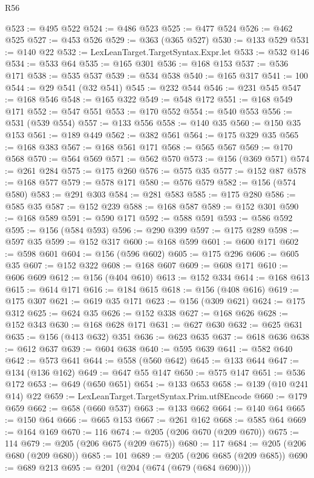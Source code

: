 \begin{lexlean}{R56}
\begin{coremodule}
{{{{{{{{{{{{{{{{{{{{{{{{{{{{{{{{{{{{{{{{{{{{{{{{{{{{{{{{{{{{{{{{{{{{{{{{{{{{{{{{{{{{{{{{{{{{{{{{{{{{{{{{{{{{{{{{{{{{{{{{{{{{{{{{{{{{{{{{{{{{{{{{{{{{{{{{{{{{{{{{{{{{{{{{{{{{{{{{{{{{{{{{{{{{{{{{{{{{{{{{{{{{{{{{{{{@523 := @495 @522
@524 := @486 @523
@525 := @477 @524
@526 := @462 @525
@527 := @453 @526
@529 := @363 (@365 @527)
@530 := @133 @529
@531 := @140 @22
@532 := LexLeanTarget.TargetSyntax.Expr.let
@533 := @532 @146
@534 := @533 @64
@535 := @165 @301
@536 := @168 @153
@537 := @536 @171
@538 := @535 @537
@539 := @534 @538
@540 := @165 @317
@541 := 100
@544 := @29 @541 (@32 @541)
@545 := @232 @544
@546 := @231 @545
@547 := @168 @546
@548 := @165 @322
@549 := @548 @172
@551 := @168 @549 @171
@552 := @547 @551
@553 := @170 @552
@554 := @540 @553
@556 := @531 (@539 @554)
@557 := @133 @556
@558 := @140 @35
@560 := @150 @35 @153
@561 := @189 @449
@562 := @382 @561
@564 := @175 @329 @35
@565 := @168 @383
@567 := @168 @561 @171
@568 := @565 @567
@569 := @170 @568
@570 := @564 @569
@571 := @562 @570
@573 := @156 (@369 @571)
@574 := @261 @284
@575 := @175 @260
@576 := @575 @35
@577 := @152 @87
@578 := @168 @577
@579 := @578 @171
@580 := @576 @579
@582 := @156 (@574 @580)
@583 := @291 @303
@584 := @281 @583
@585 := @175 @280
@586 := @585 @35
@587 := @152 @239
@588 := @168 @587
@589 := @152 @301
@590 := @168 @589
@591 := @590 @171
@592 := @588 @591
@593 := @586 @592
@595 := @156 (@584 @593)
@596 := @290 @399
@597 := @175 @289
@598 := @597 @35
@599 := @152 @317
@600 := @168 @599
@601 := @600 @171
@602 := @598 @601
@604 := @156 (@596 @602)
@605 := @175 @296
@606 := @605 @35
@607 := @152 @322
@608 := @168 @607
@609 := @608 @171
@610 := @606 @609
@612 := @156 (@404 @610)
@613 := @152 @334
@614 := @168 @613
@615 := @614 @171
@616 := @184 @615
@618 := @156 (@408 @616)
@619 := @175 @307
@621 := @619 @35 @171
@623 := @156 (@309 @621)
@624 := @175 @312
@625 := @624 @35
@626 := @152 @338
@627 := @168 @626
@628 := @152 @343
@630 := @168 @628 @171
@631 := @627 @630
@632 := @625 @631
@635 := @156 (@413 @632) @351
@636 := @623 @635
@637 := @618 @636
@638 := @612 @637
@639 := @604 @638
@640 := @595 @639
@641 := @582 @640
@642 := @573 @641
@644 := @558 (@560 @642)
@645 := @133 @644
@647 := @134 (@136 @162)
@649 := @647 @55 @147
@650 := @575 @147
@651 := @536 @172
@653 := @649 (@650 @651)
@654 := @133 @653
@658 := @139 (@10 @241 @14) @22
@659 := LexLeanTarget.TargetSyntax.Prim.utf8Encode
@660 := @179 @659
@662 := @658 (@660 @537)
@663 := @133 @662
@664 := @140 @64
@665 := @150 @64
@666 := @665 @153
@667 := @261 @162
@668 := @585 @64
@669 := @164 @169
@670 := 116
@674 := @205 (@206 @670 (@209 @670))
@675 := 114
@679 := @205 (@206 @675 (@209 @675))
@680 := 117
@684 := @205 (@206 @680 (@209 @680))
@685 := 101
@689 := @205 (@206 @685 (@209 @685))
@690 := @689 @213
@695 := @201 (@204 (@674 (@679 (@684 @690))))
}}}}}}}}}}}}}}}}}}}}}}}}}}}}}}}}}}}}}}}}}}}}}}}}}}}}}}}}}}}}}}}}}}}}}}}}}}}}}}}}}}}}}}}}}}}}}}}}}}}}}}}}}}}}}}}}}}}}}}}}}}}}}}}}}}}}}}}}}}}}}}}}}}}}}}}}}}}}}}}}}}}}}}}}}}}}}}}}}}}}}}}}}}}}}}}}}}}}}}}}}}}}}}}}}}}
\end{coremodule}
\end{lexlean}
